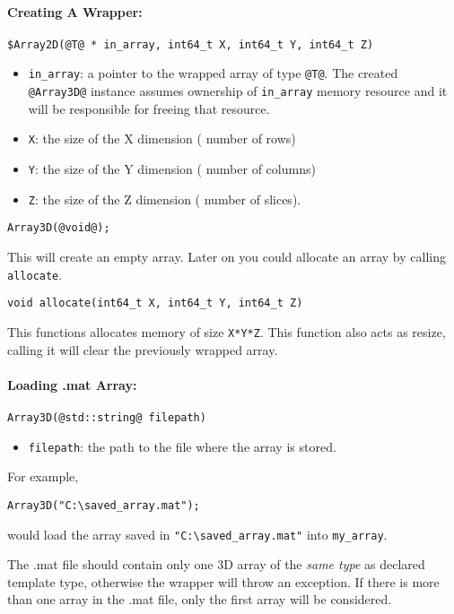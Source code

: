 \documentclass[12pt,letterpaper]{article}
\makeatletter
\def\keyhl[#1]{\lstinline{@#1@}}
\makeatother
\begin{document}
\paragraph{Creating A Wrapper:}\hspace{-2ex}
\begin{lstlisting}
$Array2D(@T@ * in_array, int64_t X, int64_t Y, int64_t Z)
\end{lstlisting}
\begin{itemize}
\item \lstinline{in_array}: a pointer to the wrapped array of type \lstinline{@T@}. The created \keyhl[Array3D] instance assumes ownership of \lstinline{in_array} memory resource and it will be responsible for freeing that resource.
\item \lstinline{X}: the size of the X dimension ( number of rows)
\item \lstinline{Y}: the size of the Y dimension ( number of columns)
\item \lstinline{Z}: the size of the Z dimension ( number of slices).
\end{itemize}

\begin{lstlisting}
Array3D(@void@);
\end{lstlisting}
This will create an empty array. Later on you could allocate an array by calling \lstinline{allocate}.
\begin{lstlisting}[backgroundcolor=\color{white}]
void allocate(int64_t X, int64_t Y, int64_t Z)
\end{lstlisting}
This functions allocates memory of size \lstinline{X*Y*Z}. This function also acts as resize, calling it will clear the previously wrapped array.

\paragraph{Loading .mat Array:}\hspace{-2ex}
\begin{lstlisting}
Array3D(@std::string@ filepath)
\end{lstlisting}
\begin{itemize}
\item \lstinline{filepath}: the path to the file where the array is stored.
\end{itemize}
For example,
\begin{lstlisting}[backgroundcolor=\color{white}]
Array3D("C:\saved_array.mat");
\end{lstlisting}
would load the array saved in \lstinline{"C:\saved_array.mat"} into \lstinline{my_array}.
\begin{tcolorbox}
The .mat file should contain only one 3D array of the {\em same type} as declared template type, otherwise the wrapper will throw an exception. If there is more than one array in the .mat file, only the first array will be considered.
\end{tcolorbox}
\end{document}
